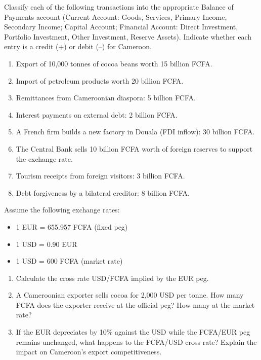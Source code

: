 \documentclass[11pt]{article}
\begin{document}
\begin{exercice}
Classify each of the following transactions into the appropriate Balance of Payments account (Current Account: Goods, Services, Primary Income, Secondary Income; Capital Account; Financial Account: Direct Investment, Portfolio Investment, Other Investment, Reserve Assets). Indicate whether each entry is a credit (+) or debit (–) for Cameroon.

\begin{enumerate}
\item Export of 10,000 tonnes of cocoa beans worth 15 billion FCFA.
\item Import of petroleum products worth 20 billion FCFA.
\item Remittances from Cameroonian diaspora: 5 billion FCFA.
\item Interest payments on external debt: 2 billion FCFA.
\item A French firm builds a new factory in Douala (FDI inflow): 30 billion FCFA.
\item The Central Bank sells 10 billion FCFA worth of foreign reserves to support the exchange rate.
\item Tourism receipts from foreign visitors: 3 billion FCFA.
\item Debt forgiveness by a bilateral creditor: 8 billion FCFA.
\end{enumerate}
\end{exercice}

\begin{exercice}
Assume the following exchange rates:
\begin{itemize}
\item 1 EUR = 655.957 FCFA (fixed peg)
\item 1 USD = 0.90 EUR
\item 1 USD = 600 FCFA (market rate)
\end{itemize}

\begin{enumerate}
\item Calculate the cross rate USD/FCFA implied by the EUR peg.
\item A Cameroonian exporter sells cocoa for 2,000 USD per tonne. How many FCFA does the exporter receive at the official peg? How many at the market rate?
\item If the EUR depreciates by 10\% against the USD while the FCFA/EUR peg remains unchanged, what happens to the FCFA/USD cross rate? Explain the impact on Cameroon's export competitiveness.
\end{enumerate}
\end{exercice}
\end{document}
